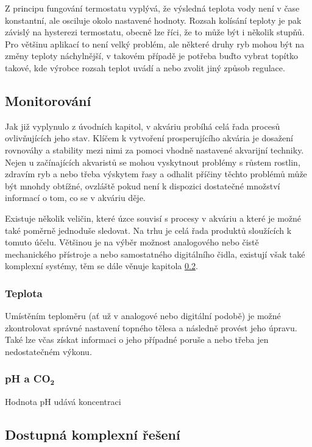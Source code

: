         Z principu fungování termostatu vyplývá, že výsledná teplota vody není v čase konstantní, ale osciluje okolo nastavené hodnoty. Rozsah kolísání teploty je pak závislý na hysterezi termostatu, obecně lze říci, že to může být i několik stupňů. Pro většinu aplikací to není velký problém, ale některé druhy ryb mohou být na změny teploty náchylnější, v takovém případě je potřeba buďto vybrat topítko takové, kde výrobce rozsah teplot uvádí a nebo zvolit jiný způsob regulace. 

    \subsection{Monitorování}
        Jak již vyplynulo z úvodních kapitol, v akváriu probíhá celá řada procesů ovlivňujících jeho stav. Klíčem k vytvoření prosperujícího akvária je dosažení rovnováhy a stability mezi nimi za pomoci vhodně nastavené akvarijní techniky. Nejen u začínajících akvaristů se mohou vyskytnout problémy s růstem rostlin, zdravím ryb a nebo třeba výskytem řasy a odhalit příčiny těchto problémů může být mnohdy obtížné, ovzláště pokud není k dispozici dostatečné množství informací o tom, co se v akváriu děje. 
        
        Existuje několik veličin, které úzce souvisí s procesy v akváriu a které je možné také poměrně jednoduše sledovat. Na trhu je celá řada produktů sloužících k tomuto účelu. Většinou je na výběr možnost analogového nebo čistě mechanického přístroje a nebo samostatného digitálního čidla, existují však také komplexní systémy, těm se dále věnuje kapitola  \ref{lab:kapitola-komplexni-reseni}. 

        \subsubsection{Teplota}
            Umístěním teploměru (ať už v analogové nebo digitální podobě) je možné zkontrolovat správné nastavení topného tělesa a následně provést jeho úpravu. Také lze včas získat informaci o jeho případné poruše a nebo třeba jen nedostatečném výkonu. 
        \subsubsection{pH a CO\(\mathbf{_{2}}\)}
            Hodnota pH udává koncentraci 

             
    \subsection{Dostupná komplexní řešení}
    \label{lab:kapitola-komplexni-reseni}
        